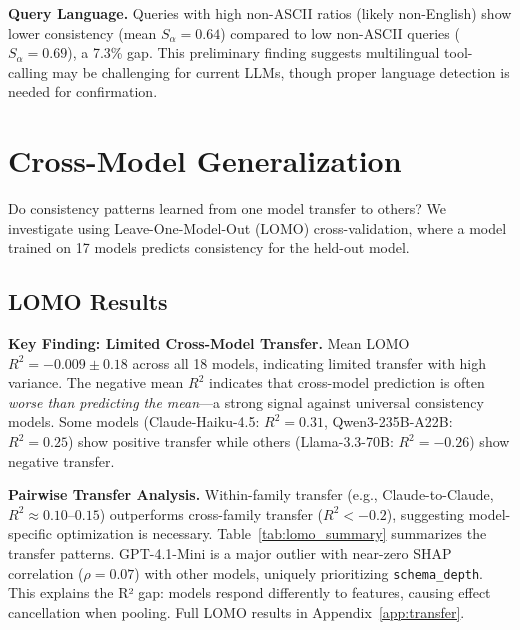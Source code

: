 \documentclass[sigconf,anonymous,review]{acmart}
\begin{document}
\textbf{Query Language.} Queries with high non-ASCII ratios (likely non-English) show lower consistency (mean $S_\alpha = 0.64$) compared to low non-ASCII queries ($S_\alpha = 0.69$), a 7.3\% gap. This preliminary finding suggests multilingual tool-calling may be challenging for current LLMs, though proper language detection is needed for confirmation.

\section{Cross-Model Generalization}
\label{sec:crossmodel}

Do consistency patterns learned from one model transfer to others? We investigate using Leave-One-Model-Out (LOMO) cross-validation, where a model trained on 17 models predicts consistency for the held-out model.

\subsection{LOMO Results}

\textbf{Key Finding: Limited Cross-Model Transfer.} Mean LOMO $R^2 = -0.009 \pm 0.18$ across all 18 models, indicating limited transfer with high variance. The negative mean $R^2$ indicates that cross-model prediction is often \textit{worse than predicting the mean}---a strong signal against universal consistency models. Some models (Claude-Haiku-4.5: $R^2 = 0.31$, Qwen3-235B-A22B: $R^2 = 0.25$) show positive transfer while others (Llama-3.3-70B: $R^2 = -0.26$) show negative transfer.

\textbf{Pairwise Transfer Analysis.} Within-family transfer (e.g., Claude-to-Claude, $R^2 \approx 0.10$--$0.15$) outperforms cross-family transfer ($R^2 < -0.2$), suggesting model-specific optimization is necessary. Table~\ref{tab:lomo_summary} summarizes the transfer patterns. GPT-4.1-Mini is a major outlier with near-zero SHAP correlation ($\rho = 0.07$) with other models, uniquely prioritizing \texttt{schema\_depth}. This explains the R² gap: models respond differently to features, causing effect cancellation when pooling. Full LOMO results in Appendix~\ref{app:transfer}.
\end{document}
